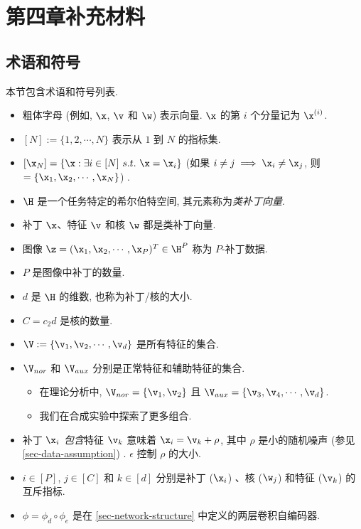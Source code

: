 \chapter{第四章补充材料}\label{app4}

\section{术语和符号}\label{sec-list-of-terms-and-notations}
本节包含术语和符号列表. 
\begin{itemize}
    \item 粗体字母 (例如, $\x$, $\v$ 和 $\w$) 表示向量. $\x$ 的第 $i$ 个分量记为 $\x^{(i)}$. 
    \item $[N] := \{1, 2, \cdots, N\}$ 表示从 $1$ 到 $N$ 的指标集. 
    \item $[\x_{N}] = \{\x : \exists i \in [N] \ s.t.\ \x = \x_i\}$  (如果 $i \neq j \implies \x_i \neq \x_j$, 则 $ = \{\x_1, \x_2, \cdots, \x_N\}$) . 
    \item $\H$ 是一个任务特定的希尔伯特空间, 其元素称为\textit{类补丁向量}. 
    \item 补丁 $\x$、特征 $\v$ 和核 $\w$ 都是类补丁向量. 
    \item 图像 $\z = (\x_1, \x_2, \cdots ,\x_P)^T \in \H^P$ 称为 $P$-补丁数据. 
    \item $P$ 是图像中补丁的数量. 
    \item $d$ 是 $\H$ 的维数, 也称为补丁/核的大小. 
    \item $C = c_2 d$ 是核的数量.  
    \item $\V := \{ \v_1, \v_2,\cdots, \v_d \}$ 是所有特征的集合. 
    \item $\V_{nor}$ 和 $\V_{aux}$ 分别是正常特征和辅助特征的集合. 
    \begin{itemize}
        \item 在理论分析中, $\V_{nor} = \{ \v_1, \v_2\}$ 且 $\V_{aux} = \{ \v_3, \v_4, \cdots , \v_d  \} $. 
        \item 我们在合成实验中探索了更多组合. 
    \end{itemize}
    \item 补丁 $\x_i$ \textit{包含}特征 $\v_k$ 意味着 $\x_i = \v_k + \rho$, 其中 $\rho$ 是小的随机噪声 (参见 \ref{sec-data-assumption}) . 
    $\epsilon$ 控制 $\rho$ 的大小. 
    \item $i \in [P]$, $j \in [C]$ 和 $k \in [d]$ 分别是补丁 ($\x_i$) 、核 ($\w_j$) 和特征 ($\v_k$) 的互斥指标. 
    \item $\phi = \phi_d \circ \phi_e$ 是在 \ref{sec-network-structure} 中定义的两层卷积自编码器. 

\end{itemize}
